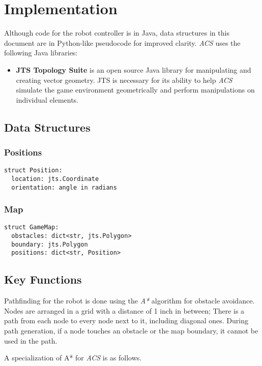 \documentclass{article}
\begin{document}
\section{Implementation}
Although code for the robot controller is in Java, data structures in this document are in Python-like pseudocode for improved clarity.
\emph{ACS} uses the following Java libraries:
\begin{itemize}
    \item \textbf{JTS Topology Suite} is an open source Java library for manipulating and creating vector geometry. JTS is necessary for its ability to help \emph{ACS} simulate the game environment geometrically and perform manipulations on individual elements.
\end{itemize}

\subsection{Data Structures}
\subsubsection{Positions}

\begin{verbatim}
struct Position:
  location: jts.Coordinate
  orientation: angle in radians
\end{verbatim}

\subsubsection{Map}
\begin{verbatim}
struct GameMap:
  obstacles: dict<str, jts.Polygon>
  boundary: jts.Polygon
  positions: dict<str, Position>
\end{verbatim}

\subsection{Key Functions}
Pathfinding for the robot is done using the \emph{A*} algorithm for obstacle avoidance. Nodes are arranged in a grid with a distance of 1 inch in between; There is a path from each node to every node next to it, including diagonal ones. During path generation, if a node touches an obstacle or the map boundary, it cannot be used in the path.

A specialization of A* for \emph{ACS} is as follows.
\end{document}
